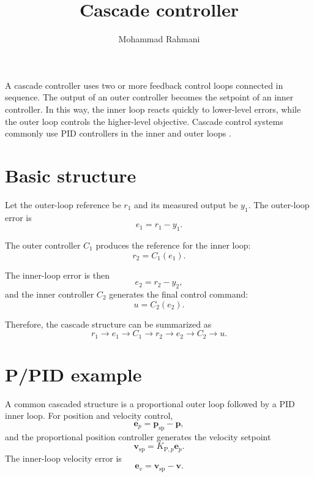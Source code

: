 \documentclass[a4paper]{article}
\title{Cascade controller}
\date{}
\author{Mohammad Rahmani}
\begin{document}
   \maketitle

   A cascade controller uses two or more feedback control loops connected in sequence. The output of an outer controller becomes the setpoint of an inner controller. In this way, the inner loop reacts quickly to lower-level errors, while the outer loop controls the higher-level objective. Cascade control systems commonly use PID controllers in the inner and outer loops \cite{lee-1998-pid-controller-tuning-for-cascade-control-systems}.


   \section{Basic structure}
      Let the outer-loop reference be $r_1$ and its measured output be $y_1$. The outer-loop error is
      \[
         e_1=r_1-y_1.
      \]

      The outer controller $C_1$ produces the reference for the inner loop:
      \[
         r_2=C_1(e_1).
      \]

      The inner-loop error is then
      \[
         e_2=r_2-y_2,
      \]
      and the inner controller $C_2$ generates the final control command:
      \[
         u=C_2(e_2).
      \]

      Therefore, the cascade structure can be summarized as
      \[
         r_1
         \rightarrow
         e_1
         \rightarrow
         C_1
         \rightarrow
         r_2
         \rightarrow
         e_2
         \rightarrow
         C_2
         \rightarrow
         u.
      \]

   \section{P/PID example}
      A common cascaded structure is a proportional outer loop followed by a PID inner loop. For position and velocity control,
      \[
         \mathbf{e}_p
         =
         \mathbf{p}_{\mathrm{sp}}-\mathbf{p},
      \]
      and the proportional position controller generates the velocity setpoint
      \[
         \mathbf{v}_{\mathrm{sp}}
         =
         K_{\mathrm{P},p}\mathbf{e}_p.
      \]
      The inner-loop velocity error is
      \[
         \mathbf{e}_v
         =
         \mathbf{v}_{\mathrm{sp}}-\mathbf{v}.
      \]
\end{document}
